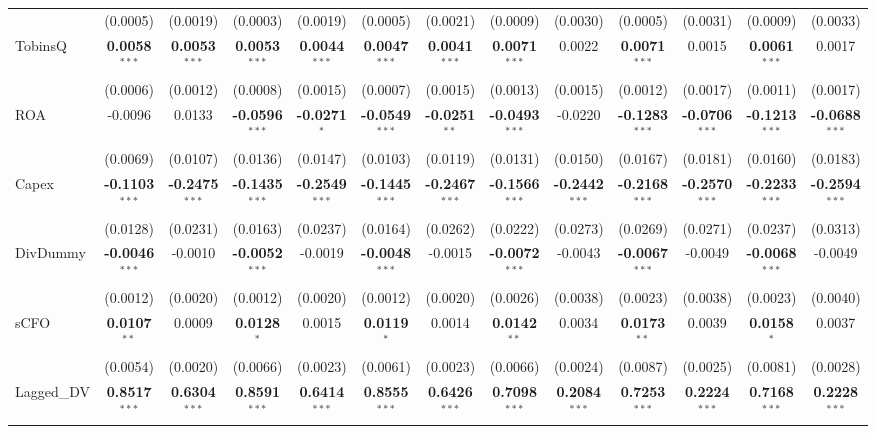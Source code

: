 \documentclass[11pt,a4paper]{article}
\begin{document}
\begin{table}[htbp]
\begin{tabular}{lcccccccccccc}
 & (0.0005) & (0.0019) & (0.0003) & (0.0019) & (0.0005) & (0.0021) & (0.0009) & (0.0030) & (0.0005) & (0.0031) & (0.0009) & (0.0033) \\
TobinsQ & \textbf{0.0058}$^{***}$ & \textbf{0.0053}$^{***}$ & \textbf{0.0053}$^{***}$ & \textbf{0.0044}$^{***}$ & \textbf{0.0047}$^{***}$ & \textbf{0.0041}$^{***}$ & \textbf{0.0071}$^{***}$ & 0.0022 & \textbf{0.0071}$^{***}$ & 0.0015 & \textbf{0.0061}$^{***}$ & 0.0017 \\
 & (0.0006) & (0.0012) & (0.0008) & (0.0015) & (0.0007) & (0.0015) & (0.0013) & (0.0015) & (0.0012) & (0.0017) & (0.0011) & (0.0017) \\
ROA & -0.0096 & 0.0133 & \textbf{-0.0596}$^{***}$ & \textbf{-0.0271}$^{*}$ & \textbf{-0.0549}$^{***}$ & \textbf{-0.0251}$^{**}$ & \textbf{-0.0493}$^{***}$ & -0.0220 & \textbf{-0.1283}$^{***}$ & \textbf{-0.0706}$^{***}$ & \textbf{-0.1213}$^{***}$ & \textbf{-0.0688}$^{***}$ \\
 & (0.0069) & (0.0107) & (0.0136) & (0.0147) & (0.0103) & (0.0119) & (0.0131) & (0.0150) & (0.0167) & (0.0181) & (0.0160) & (0.0183) \\
Capex & \textbf{-0.1103}$^{***}$ & \textbf{-0.2475}$^{***}$ & \textbf{-0.1435}$^{***}$ & \textbf{-0.2549}$^{***}$ & \textbf{-0.1445}$^{***}$ & \textbf{-0.2467}$^{***}$ & \textbf{-0.1566}$^{***}$ & \textbf{-0.2442}$^{***}$ & \textbf{-0.2168}$^{***}$ & \textbf{-0.2570}$^{***}$ & \textbf{-0.2233}$^{***}$ & \textbf{-0.2594}$^{***}$ \\
 & (0.0128) & (0.0231) & (0.0163) & (0.0237) & (0.0164) & (0.0262) & (0.0222) & (0.0273) & (0.0269) & (0.0271) & (0.0237) & (0.0313) \\
DivDummy & \textbf{-0.0046}$^{***}$ & -0.0010 & \textbf{-0.0052}$^{***}$ & -0.0019 & \textbf{-0.0048}$^{***}$ & -0.0015 & \textbf{-0.0072}$^{***}$ & -0.0043 & \textbf{-0.0067}$^{***}$ & -0.0049 & \textbf{-0.0068}$^{***}$ & -0.0049 \\
 & (0.0012) & (0.0020) & (0.0012) & (0.0020) & (0.0012) & (0.0020) & (0.0026) & (0.0038) & (0.0023) & (0.0038) & (0.0023) & (0.0040) \\
sCFO & \textbf{0.0107}$^{**}$ & 0.0009 & \textbf{0.0128}$^{*}$ & 0.0015 & \textbf{0.0119}$^{*}$ & 0.0014 & \textbf{0.0142}$^{**}$ & 0.0034 & \textbf{0.0173}$^{**}$ & 0.0039 & \textbf{0.0158}$^{*}$ & 0.0037 \\
 & (0.0054) & (0.0020) & (0.0066) & (0.0023) & (0.0061) & (0.0023) & (0.0066) & (0.0024) & (0.0087) & (0.0025) & (0.0081) & (0.0028) \\
Lagged\_DV & \textbf{0.8517}$^{***}$ & \textbf{0.6304}$^{***}$ & \textbf{0.8591}$^{***}$ & \textbf{0.6414}$^{***}$ & \textbf{0.8555}$^{***}$ & \textbf{0.6426}$^{***}$ & \textbf{0.7098}$^{***}$ & \textbf{0.2084}$^{***}$ & \textbf{0.7253}$^{***}$ & \textbf{0.2224}$^{***}$ & \textbf{0.7168}$^{***}$ & \textbf{0.2228}$^{***}$ \\

\end{tabular}
\end{table}
\end{document}
